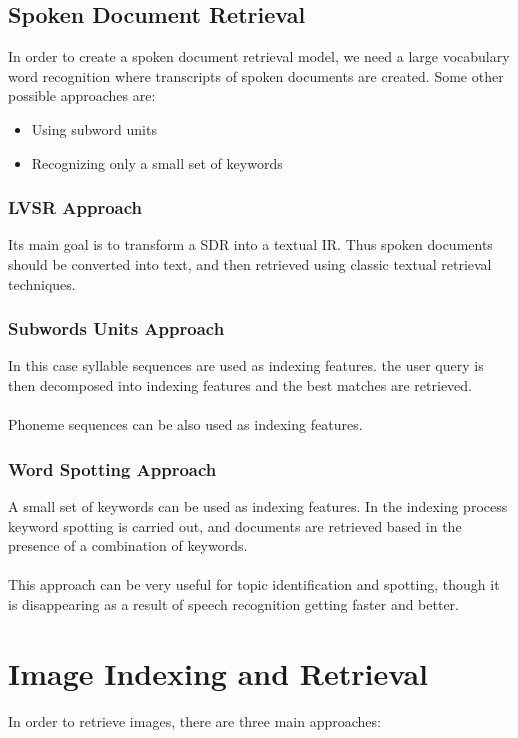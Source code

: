 \documentclass{article}
\begin{document}
\subsection{Spoken Document Retrieval}
In order to create a spoken document retrieval model, we need a large vocabulary word recognition where transcripts of spoken documents are created. Some other possible approaches are:

\begin{itemize}
	\item Using subword units
	\item Recognizing only a small set of keywords
\end{itemize}

\subsubsection{LVSR Approach}
Its main goal is to transform a SDR into a textual IR. Thus spoken documents should be converted into text, and then retrieved using classic textual retrieval techniques.

\subsubsection{Subwords Units Approach}
In this case syllable sequences are used as indexing features. the user query is then decomposed into indexing features and the best matches are retrieved. \\ \\
Phoneme sequences can be also used as indexing features.

\subsubsection{Word Spotting Approach}
A small set of keywords can be used as indexing features. In the indexing process keyword spotting is carried out, and documents are retrieved based in the presence of a combination of keywords. \\ \\
This approach can be very useful for topic identification and spotting, though it is disappearing as a result of speech recognition getting faster and better.

\section{Image Indexing and Retrieval}
In order to retrieve images, there are three main approaches:
\end{document}
